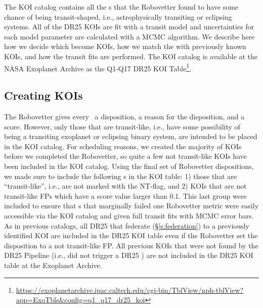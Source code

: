 \label{s:assemble}
The KOI catalog contains all the \opstce s that the Robovetter found to have some chance of being transit-shaped, i.e., astrophysically transiting or eclipsing systems. All of the DR25 KOIs are fit with a transit model and uncertainties for each model parameter are calculated with a MCMC algorithm.  We describe here how we decide which  become KOIs, how we match the  with previously known KOIs, and how the transit fits are performed. The KOI catalog is available at the NASA Exoplanet Archive as the Q1-Q17 DR25 KOI Table\footnote{\url{https://exoplanetarchive.ipac.caltech.edu/cgi-bin/TblView/nph-tblView?app=ExoTbls\&config=q1\_q17\_dr25\_koi}}.
\label{koisec}

\subsection{Creating KOIs}
The Robovetter gives every \opstce\ a disposition, a reason for the disposition, and a score.  However, only those that are transit-like, i.e., have some possibility of being a transiting exoplanet or eclipsing binary system, are intended to be placed in the KOI catalog. For scheduling reasons, we created the majority of KOIs before we completed the Robovetter, so quite a few not transit-like KOIs have been included in the KOI catalog. Using the final set of Robovetter dispositions, we made sure to include the following \opstce s in the KOI table: 1) those that are ``transit-like'', i.e., are not marked with the NT-flag, and 2) KOIs that are not transit-like FPs which have a score value larger than 0.1.  This last group were included to ensure that \opstce s that marginally failed one Robovetter metric were easily accessible via the KOI catalog and given full transit fits with MCMC error bars. As in previous catalogs, all DR25  that federate (\S\ref{s:federation}) to a previously identified KOI are included in the DR25 KOI table even if the Robovetter set the disposition to a not transit-like FP. All previous KOIs that were not found by the DR25 \Kepler{} Pipeline (i.e., did not trigger a DR25 \opstce{}) are not included in the DR25 KOI table at the Exoplanet Archive.


